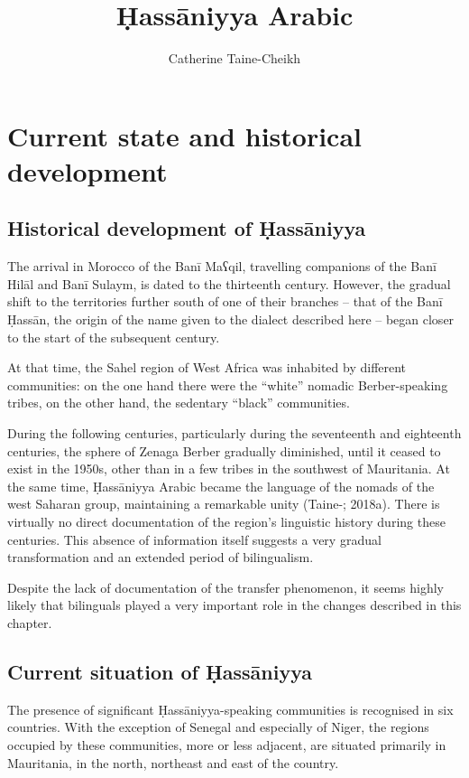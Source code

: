 \documentclass[output=paper]{langsci/langscibook}
\author{Catherine Taine-Cheikh\affiliation{CNRS, Lacito}}
\title{Ḥassāniyya Arabic}
\begin{document}
\maketitle 
 

\section{Current state and historical development}

\subsection{ Historical development of Ḥassāniyya} %

The arrival in Morocco of the Banī Maʕqil, travelling companions of the Banī Hilāl and Banī Sulaym, is dated to the thirteenth century. However, the gradual shift to the territories further south of one of their branches – that of the Banī Ḥassān, the origin of the name given to the dialect described here – began closer to the start of the subsequent century. 

At that time, the Sahel region of West Africa was inhabited by different communities: on the one hand there were the “white” nomadic Berber-speaking tribes, on the other hand, the sedentary “black” communities.

During the following centuries, particularly during the seventeenth and eighteenth centuries, the sphere of Zenaga Berber gradually diminished, until it ceased to exist in the 1950s, other than in a few tribes in the southwest of Mauritania. At the same time, Ḥassāniyya Arabic became the language of the nomads of the west Saharan group, maintaining a remarkable unity (Taine-\citealt{Cheikh2016}; 2018a). There is virtually no direct documentation of the region’s linguistic history during these centuries. This absence of information itself suggests a very gradual transformation and an extended period of bilingualism.

Despite the lack of documentation of the transfer phenomenon, it seems highly likely that bilinguals played a very important role in the changes described in this chapter. 

\subsection{ Current situation of Ḥassāniyya} %

The presence of significant Ḥassāniyya-speaking communities is recognised in six countries. With the exception of Senegal and especially of Niger, the regions occupied by these communities, more or less adjacent, are situated primarily in Mauritania, in the north, northeast and east of the country. 
\end{document}
